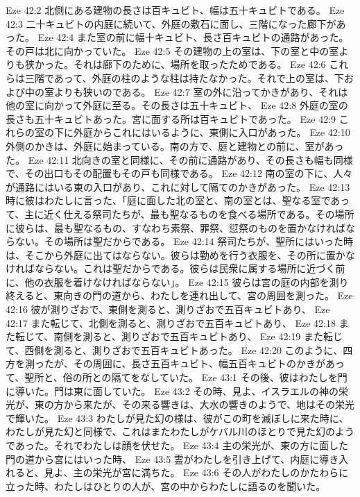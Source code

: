 Eze 42:2  北側にある建物の長さは百キュビト、幅は五十キュビトである。
Eze 42:3  二十キュビトの内庭に続いて、外庭の敷石に面し、三階になった廊下があった。
Eze 42:4  また室の前に幅十キュビト、長さ百キュビトの通路があった。その戸は北に向かっていた。
Eze 42:5  その建物の上の室は、下の室と中の室よりも狭かった。それは廊下のために、場所を取ったためである。
Eze 42:6  これらは三階であって、外庭の柱のような柱は持たなかった。それで上の室は、下および中の室よりも狭いのである。
Eze 42:7  室の外に沿ってかきがあり、それは他の室に向かって外庭に至る。その長さは五十キュビト、
Eze 42:8  外庭の室の長さも五十キュビトあった。宮に面する所は百キュビトであった。
Eze 42:9  これらの室の下に外庭からこれにはいるように、東側に入口があった。
Eze 42:10  外側のかきは、外庭に始まっている。南の方で、庭と建物との前に、室があった。
Eze 42:11  北向きの室と同様に、その前に通路があり、その長さも幅も同様で、その出口もその配置もその戸も同様である。
Eze 42:12  南の室の下に、人々が通路にはいる東の入口があり、これに対して隔てのかきがあった。
Eze 42:13  時に彼はわたしに言った、「庭に面した北の室と、南の室とは、聖なる室であって、主に近く仕える祭司たちが、最も聖なるものを食べる場所である。その場所に彼らは、最も聖なるもの、すなわち素祭、罪祭、愆祭のものを置かなければならない。その場所は聖だからである。
Eze 42:14  祭司たちが、聖所にはいった時は、そこから外庭に出てはならない。彼らは勤めを行う衣服を、その所に置かなければならない。これは聖だからである。彼らは民衆に属する場所に近づく前に、他の衣服を着けなければならない」。
Eze 42:15  彼らは宮の庭の内部を測り終えると、東向きの門の道から、わたしを連れ出して、宮の周囲を測った。
Eze 42:16  彼が測りざおで、東側を測ると、測りざおで五百キュビトあり、
Eze 42:17  また転じて、北側を測ると、測りざおで五百キュビトあり、
Eze 42:18  また転じて、南側を測ると、測りざおで五百キュビトあり、
Eze 42:19  また転じて、西側を測ると、測りざおで五百キュビトあった。
Eze 42:20  このように、四方を測ったが、その周囲に、長さ五百キュビト、幅五百キュビトのかきがあって、聖所と、俗の所との隔てをなしていた。
Eze 43:1  その後、彼はわたしを門に導いた。門は東に面していた。
Eze 43:2  その時、見よ、イスラエルの神の栄光が、東の方から来たが、その来る響きは、大水の響きのようで、地はその栄光で輝いた。
Eze 43:3  わたしが見た幻の様は、彼がこの町を滅ぼしに来た時に、わたしが見た幻と同様で、これはまたわたしがケバル川のほとりで見た幻のようであった。それでわたしは顔を伏せた。
Eze 43:4  主の栄光が、東の方に面した門の道から宮にはいった時、
Eze 43:5  霊がわたしを引き上げて、内庭に導き入れると、見よ、主の栄光が宮に満ちた。
Eze 43:6  その人がわたしのかたわらに立った時、わたしはひとりの人が、宮の中からわたしに語るのを聞いた。
